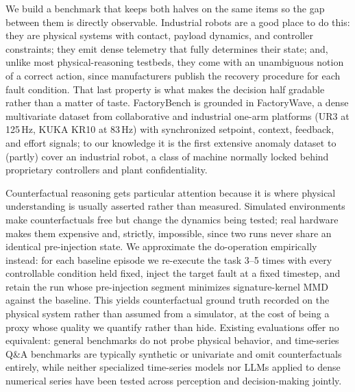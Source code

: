 We build a benchmark that keeps both halves on the same items so the gap between them is directly observable. Industrial robots are a good place to do this: they are physical systems with contact, payload dynamics, and controller constraints; they emit dense telemetry that fully determines their state; and, unlike most physical-reasoning testbeds, they come with an unambiguous notion of a correct action, since manufacturers publish the recovery procedure for each fault condition. That last property is what makes the decision half gradable rather than a matter of taste. FactoryBench is grounded in FactoryWave, a dense multivariate dataset from collaborative and industrial one-arm platforms (UR3 at 125\,Hz, KUKA KR10 at 83\,Hz) with synchronized setpoint, context, feedback, and effort signals; to our knowledge it is the first extensive anomaly dataset to (partly) cover an industrial robot, a class of machine normally locked behind proprietary controllers and plant confidentiality.

Counterfactual reasoning gets particular attention because it is where physical understanding is usually asserted rather than measured. Simulated environments make counterfactuals free but change the dynamics being tested; real hardware makes them expensive and, strictly, impossible, since two runs never share an identical pre-injection state. We approximate the do-operation empirically instead: for each baseline episode we re-execute the task 3--5 times with every controllable condition held fixed, inject the target fault at a fixed timestep, and retain the run whose pre-injection segment minimizes signature-kernel MMD against the baseline. This yields counterfactual ground truth recorded on the physical system rather than assumed from a simulator, at the cost of being a proxy whose quality we quantify rather than hide. Existing evaluations offer no equivalent: general benchmarks \cite{hendrycks2021mmlu,srivastava2023bigbench,yue2024mmmu} do not probe physical behavior, and time-series Q\&A benchmarks are typically synthetic or univariate and omit counterfactuals entirely, while neither specialized time-series models \cite{zhou2021informer,su2019omni,audibert2020usad} nor LLMs applied to dense numerical series \cite{gruver2023llmtime,jin2024timellm} have been tested across perception and decision-making jointly.

